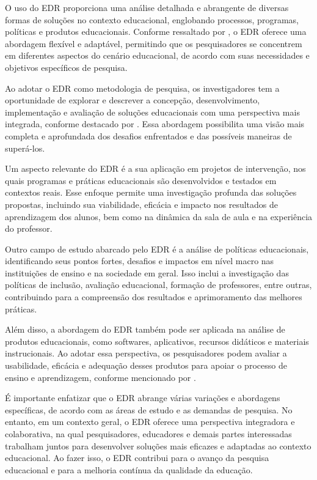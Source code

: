 O uso do EDR proporciona uma análise detalhada e abrangente de diversas formas de soluções no contexto educacional, englobando processos, programas, políticas e produtos educacionais. Conforme ressaltado por , o EDR oferece uma abordagem flexível e adaptável, permitindo que os pesquisadores se concentrem em diferentes aspectos do cenário educacional, de acordo com suas necessidades e objetivos específicos de pesquisa.

Ao adotar o EDR como metodologia de pesquisa, os investigadores tem a oportunidade de explorar e descrever a concepção, desenvolvimento, implementação e avaliação de soluções educacionais com uma perspectiva mais integrada, conforme destacado por . Essa abordagem possibilita uma visão mais completa e aprofundada dos desafios enfrentados e das possíveis maneiras de superá-los.

Um aspecto relevante do EDR é a sua aplicação em projetos de intervenção, nos quais programas e práticas educacionais são desenvolvidos e testados em contextos reais. Esse enfoque permite uma investigação profunda das soluções propostas, incluindo sua viabilidade, eficácia e impacto nos resultados de aprendizagem dos alunos, bem como na dinâmica da sala de aula e na experiência do professor.

Outro campo de estudo abarcado pelo EDR é a análise de políticas educacionais, identificando seus pontos fortes, desafios e impactos em nível macro nas instituições de ensino e na sociedade em geral. Isso inclui a investigação das políticas de inclusão, avaliação educacional, formação de professores, entre outras, contribuindo para a compreensão dos resultados e aprimoramento das melhores práticas.

Além disso, a abordagem do EDR também pode ser aplicada na análise de produtos educacionais, como softwares, aplicativos, recursos didáticos e materiais instrucionais. Ao adotar essa perspectiva, os pesquisadores podem avaliar a usabilidade, eficácia e adequação desses produtos para apoiar o processo de ensino e aprendizagem, conforme mencionado por .

É importante enfatizar que o EDR abrange várias variações e abordagens específicas, de acordo com as áreas de estudo e as demandas de pesquisa. No entanto, em um contexto geral, o EDR oferece uma perspectiva integradora e colaborativa, na qual pesquisadores, educadores e demais partes interessadas trabalham juntos para desenvolver soluções mais eficazes e adaptadas ao contexto educacional. Ao fazer isso, o EDR contribui para o avanço da pesquisa educacional e para a melhoria contínua da qualidade da educação.

